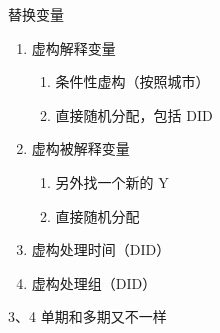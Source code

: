 \documentclass[
  ignorenonframetext,
  aspectratio=169,
  fontset=ubuntu]{ctexbeamer}
\providecommand{\tightlist}{%
  \setlength{\itemsep}{0pt}\setlength{\parskip}{0pt}}
\begin{document}
\begin{frame}[fragile]{替换变量}
\label{ux66ffux6362ux53d8ux91cf}
\begin{enumerate}
\tightlist
\item
  虚构解释变量

  \begin{enumerate}
  \tightlist
  \item
    条件性虚构（按照城市）
  \item
    直接随机分配，包括 DID
  \end{enumerate}
\item
  虚构被解释变量

  \begin{enumerate}
  \tightlist
  \item
    另外找一个新的 Y
  \item
    直接随机分配
  \end{enumerate}
\item
  虚构处理时间（DID）
\item
  虚构处理组（DID）
\end{enumerate}

3、4 单期和多期又不一样
\end{frame}
\end{document}
